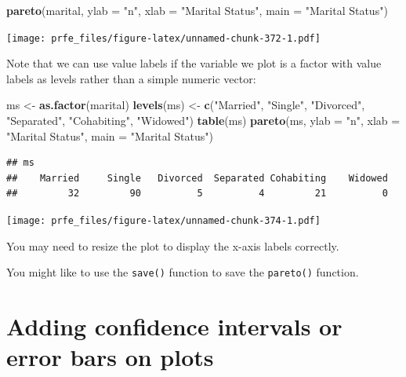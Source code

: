 \documentclass[12pt,a4paper]{book}
\newenvironment{Shaded}{\begin{snugshade}}{\end{snugshade}}
\newcommand{\KeywordTok}[1]{\textcolor[rgb]{0.13,0.29,0.53}{\textbf{#1}}}
\newcommand{\DataTypeTok}[1]{\textcolor[rgb]{0.13,0.29,0.53}{#1}}
\newcommand{\StringTok}[1]{\textcolor[rgb]{0.31,0.60,0.02}{#1}}
\newcommand{\NormalTok}[1]{#1}
\theoremstyle{definition}
\theoremstyle{definition}
\theoremstyle{definition}
\theoremstyle{remark}
\begin{document}
\begin{Shaded}
\begin{Highlighting}[]
\KeywordTok{pareto}\NormalTok{(marital, }\DataTypeTok{ylab =} \StringTok{"n"}\NormalTok{, }\DataTypeTok{xlab =} \StringTok{"Marital Status"}\NormalTok{,}
       \DataTypeTok{main =} \StringTok{"Marital Status"}\NormalTok{)}
\end{Highlighting}
\end{Shaded}

\texttt{[image: prfe\_files/figure-latex/unnamed-chunk-372-1.pdf]}

Note that we can use value labels if the variable we plot is a factor
with value labels as levels rather than a simple numeric vector:

\begin{Shaded}
\begin{Highlighting}[]
\NormalTok{ms <-}\StringTok{ }\KeywordTok{as.factor}\NormalTok{(marital)}
\KeywordTok{levels}\NormalTok{(ms) <-}\StringTok{ }\KeywordTok{c}\NormalTok{(}\StringTok{"Married"}\NormalTok{, }\StringTok{"Single"}\NormalTok{, }\StringTok{"Divorced"}\NormalTok{, }\StringTok{"Separated"}\NormalTok{,}
                \StringTok{"Cohabiting"}\NormalTok{, }\StringTok{"Widowed"}\NormalTok{)}
\KeywordTok{table}\NormalTok{(ms)}
\KeywordTok{pareto}\NormalTok{(ms, }\DataTypeTok{ylab =} \StringTok{"n"}\NormalTok{, }\DataTypeTok{xlab =} \StringTok{"Marital Status"}\NormalTok{,}
       \DataTypeTok{main =} \StringTok{"Marital Status"}\NormalTok{)}
\end{Highlighting}
\end{Shaded}

\begin{verbatim}
## ms
##    Married     Single   Divorced  Separated Cohabiting    Widowed 
##         32         90          5          4         21          0
\end{verbatim}

\texttt{[image: prfe\_files/figure-latex/unnamed-chunk-374-1.pdf]}

You may need to resize the plot to display the x-axis labels correctly.

You might like to use the \texttt{save()} function to save the
\texttt{pareto()} function.

\hypertarget{adding-confidence-intervals-or-error-bars-on-plots}{%
\section{Adding confidence intervals or error bars on
plots}\label{adding-confidence-intervals-or-error-bars-on-plots}}
\end{document}
